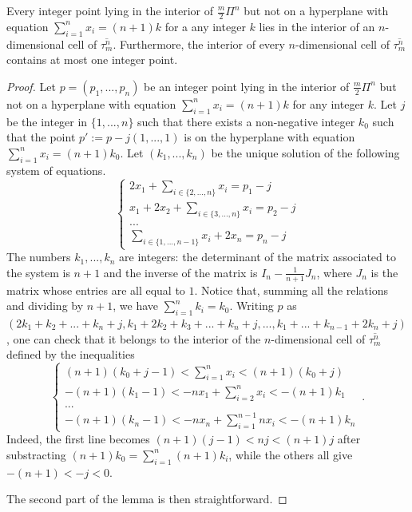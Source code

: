\documentclass[10pt,a4paper]{amsart}
\begin{document}
\begin{lem}
    \label{lemma_points_in_cells}
    Every integer point lying in the interior of $\frac{m}{2}\Pi^n$ but not on a hyperplane with equation $\sum_{i=1}^n x_i = (n+1)k$ for a any integer $k$ lies in the interior of an $n$-dimensional cell of $\overline{\tau_m^n}$. Furthermore, the interior of every $n$-dimensional cell of $\overline{\tau_m^n}$ contains at most one integer point. 
\end{lem}

\begin{proof}
    Let $p = (p_1,..., p_n)$ be an integer point lying in the interior of $\frac{m}{2}\Pi^n$ but not on a hyperplane with equation $\sum_{i=1}^n x_i = (n+1)k$ for any integer $k$. Let $j$ be the integer in $\{1,...,n \}$ such that there exists a non-negative integer $k_0$ such that the point $p' := p - j(1,...,1)$ is on the hyperplane with equation $\sum_{i=1}^n x_i = (n+1)k_0$. Let $(k_1,...,k_n)$ be the unique solution of the following system of equations.
    \begin{equation}
    \begin{cases}
      2x_1 + \sum_{i \in \{2,...,n \}}x_i =  p_1 - j\\
      x_1 + 2x_2 + \sum_{i \in \{3,...,n \}}x_i = p_2 - j\\
      ...\\
      \sum_{i \in \{1,...,n-1\}}x_i + 2x_n = p_n-j
    \end{cases}
    \end{equation}
    The numbers $k_1,...,k_n$ are integers: the determinant of the matrix associated to the system is $n+1$ and the inverse of the matrix is $I_n - \frac{1}{n+1}J_n$, where $J_n$ is the matrix whose entries are all equal to $1$.
    Notice that, summing all the relations and dividing by $n+1$, we have $\sum_{i = 1}^n k_i = k_0$. Writing $p$ as $(2k_1 + k_2+...+k_n + j, k_1 + 2k_2 + k_3 + ... + k_n + j, ..., k_1 + ... + k_{n-1} + 2k_n + j)$, one can check that it belongs to the interior of the $n$-dimensional cell of $\overline{\tau_m^n}$ defined by the inequalities
    \begin{equation}
    \begin{cases}
        (n+1)(k_0 + j -1) < \sum_{i = 1}^n x_i < (n+1)(k_0 + j)\\
        -(n+1)(k_1-1) < -nx_1 + \sum_{i=2}^n x_i < -(n+1)k_1\\
        ...\\
        -(n+1)(k_n-1) < -nx_n + \sum_{i=1}^{n-1}n x_i < -(n+1)k_n
    \end{cases} \, .
    \end{equation}
    Indeed, the first line becomes $(n+1)(j-1) < nj < (n+1)j$ after substracting $(n+1)k_0 = \sum_{i=1}^n (n+1)k_i$, while the others all give $-(n+1) < -j < 0$.

    The second part of the lemma is then straightforward.
\end{proof}
\end{document}
